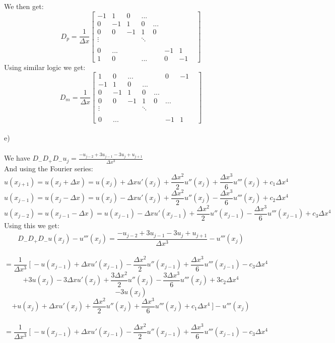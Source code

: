\documentclass[12pt, letterpaper, twoside]{article}
\begin{document}
We then get:
$$
D_p =
\frac{1}{\Delta x}
\begin{bmatrix}
-1 & 1 & 0 & ... &&&&\\
0  & -1& 1 & 0   &...&&&\\
0  & 0 & -1& 1   & 0 &&&\\
\vdots &&& \ddots\\
\\
0 & ... &&&& -1 & 1\\
1 & 0 && ... && 0 & -1 
\end{bmatrix}
$$
Using similar logic we get:
$$
D_m =
\frac{1}{\Delta x}
\begin{bmatrix}
1 & 0 &...&&& 0 & -1\\
-1 & 1 & 0 & ... &&&&\\
0  & -1& 1 & 0   &...&&&\\
0  & 0 & -1& 1   & 0 &...&&\\
\vdots &&& \ddots\\
\\
0 & ... &&&& -1 & 1
\end{bmatrix}
$$
\newpage
\ \\
e)\\
\ \\
We have $D_-D_+D_-u_j = \frac{-u_{j-2} + 3u_{j-1} - 3u_j + u_{j+1}}{\Delta x^3}$\\
And using the Fourier series:\\
$$
u(x_{j+1}) = u(x_j + \Delta x)
=
u(x_j) + \Delta x u'(x_j) + \frac{\Delta x^2}{2}u''(x_j) + \frac{\Delta x^3}{6}u'''(x_j) + c_1\Delta x^4
$$
$$
u(x_{j-1}) = u(x_j - \Delta x)
=
u(x_j) - \Delta x u'(x_j) + \frac{\Delta x^2}{2}u''(x_j) - \frac{\Delta x^3}{6}u'''(x_j) + c_2\Delta x^4
$$ 
$$
u(x_{j-2}) = u(x_{j-1} - \Delta x)
=
u(x_{j-1}) - \Delta x u'(x_{j-1}) + \frac{\Delta x^2}{2}u''(x_{j-1}) - \frac{\Delta x^3}{6}u'''(x_{j-1}) + c_3\Delta x^4
$$
Using this we get:
$$
D_-D_+D_-u(x_j) - u'''(x_j)
=
\frac{-u_{j-2} + 3u_{j-1} - 3u_j + u_{j+1}}{\Delta x^3} - u'''(x_j)
$$
\ \\
$$
=
\frac{1}{\Delta x^3}\ [\ 
- u(x_{j-1}) + \Delta x u'(x_{j-1}) - \frac{\Delta x^2}{2}u''(x_{j-1}) + \frac{\Delta x^3}{6}u'''(x_{j-1}) - c_3\Delta x^4
$$
$$
+ 3u(x_j) - 3\Delta x u'(x_j) + \frac{3\Delta x^2}{2}u''(x_j) - \frac{3\Delta x^3}{6}u'''(x_j) + 3c_2\Delta x^4
$$
$$
-3u(x_j)
$$
$$
+ u(x_j) + \Delta x u'(x_j) + \frac{\Delta x^2}{2}u''(x_j) + \frac{\Delta x^3}{6}u'''(x_j) + c_1\Delta x^4\ ]
- u'''(x_j)
$$
\ \\
$$
=
\frac{1}{\Delta x^3}\ [\ 
- u(x_{j-1}) + \Delta x u'(x_{j-1}) - \frac{\Delta x^2}{2}u''(x_{j-1}) + \frac{\Delta x^3}{6}u'''(x_{j-1}) - c_3\Delta x^4	
$$
\end{document}
